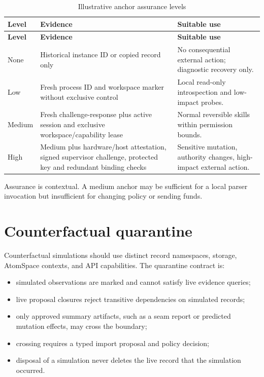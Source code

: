 \documentclass[11pt,oneside]{report}
\begin{document}
\begin{longtable}{@{}L{0.75in}L{2.40in}L{3.30in}@{}}
\caption{Illustrative anchor assurance levels}\label{tab:assurance}\\
\toprule
\textbf{Level} & \textbf{Evidence} & \textbf{Suitable use} \\
\midrule
\endfirsthead
\toprule
\textbf{Level} & \textbf{Evidence} & \textbf{Suitable use} \\
\midrule
\endhead
None & Historical instance ID or copied record only & No consequential external action; diagnostic recovery only. \\
Low & Fresh process ID and workspace marker without exclusive control & Local read-only introspection and low-impact probes. \\
Medium & Fresh challenge-response plus active session and exclusive workspace/capability lease & Normal reversible skills within permission bounds. \\
High & Medium plus hardware/host attestation, signed supervisor challenge, protected key and redundant binding checks & Sensitive mutation, authority changes, high-impact external action. \\
\bottomrule
\end{longtable}

Assurance is contextual. A medium anchor may be sufficient for a local parser invocation but insufficient for changing policy or sending funds.

\section{Counterfactual quarantine}

Counterfactual simulations should use distinct record namespaces, storage, AtomSpace contexts, and API capabilities. The quarantine contract is:

\begin{itemize}
  \item simulated observations are marked and cannot satisfy live evidence queries;
  \item live proposal closures reject transitive dependencies on simulated records;
  \item only approved summary artifacts, such as a seam report or predicted mutation effects, may cross the boundary;
  \item crossing requires a typed import proposal and policy decision;
  \item disposal of a simulation never deletes the live record that the simulation occurred.
\end{itemize}
\end{document}
